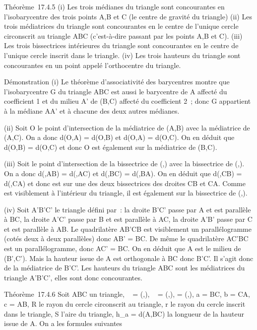 \documentclass[]{article}
\begin{document}
Théorème~17.4.5 (i) Les trois médianes du triangle sont concourantes en
l'isobarycentre des trois points A,B et C (le centre de gravité du
triangle) (ii) Les trois médiatrices du triangle sont concourantes en le
centre de l'unique cercle circonscrit au triangle ABC (c'est-à-dire
passant par les points A,B et C). (iii) Les trois bissectrices
intérieures du triangle sont concourantes en le centre de l'unique
cercle inscrit dans le triangle. (iv) Les trois hauteurs du triangle
sont concourantes en un point appelé l'orthocentre du triangle.

Démonstration (i) Le théorème d'associativité des barycentres montre que
l'isobarycentre G du triangle ABC est aussi le barycentre de A affecté
du coefficient 1 et du milieu A' de (B,C) affecté du coefficient 2~;
donc G appartient à la médiane AA' et à chacune des deux autres
médianes.

(ii) Soit O le point d'intersection de la médiatrice de (A,B) avec la
médiatrice de (A,C). On a donc d(O,A) = d(O,B) et d(O,A) = d(O,C). On en
déduit que d(O,B) = d(O,C) et donc O est également sur la médiatrice de
(B,C).

(iii) Soit \Omega le point d'intersection de la bissectrice de
(\overrightarrowAB,\overrightarrowAC)
avec la bissectrice de
(\overrightarrowBC,\overrightarrowBA).
On a donc d(\Omega,AB) = d(\Omega,AC) et d(\Omega,BC) = d(\Omega,BA). On en déduit que
d(\Omega,CB) = d(\Omega,CA) et donc \Omega est sur une des deux bissectrices des
droites CB et CA. Comme \Omega est visiblement à l'intérieur du triangle, il
est également sur la bissectrice de
(\overrightarrowCA,\overrightarrowCB).

(iv) Soit A'B'C' le triangle défini par~: la droite B'C' passe par A et
est parallèle à BC, la droite A'C' passe par B et est parallèle à AC, la
droite A'B' passe par C et est parallèle à AB. Le quadrilatère AB'CB est
visiblement un parallélogramme (cotés deux à deux parallèles) donc AB' =
BC. De même le quadrilatère AC'BC est un parallélogramme, donc AC' = BC.
On en déduit que A est le milieu de (B',C'). Mais la hauteur issue de A
est orthogonale à BC donc B'C'. Il s'agit donc de la médiatrice de B'C'.
Les hauteurs du triangle ABC sont les médiatrices du triangle A'B'C',
elles sont donc concourantes.

Théorème~17.4.6 Soit ABC un triangle, \alpha~ =\widehat
(\overrightarrowAB,\overrightarrowAC),
\beta~ =\widehat
(\overrightarrowBC,\overrightarrowBA),
\gamma =\widehat
(\overrightarrowCA,\overrightarrowCB),
a = BC, b = CA, c = AB, R le rayon du cercle circonscrit au triangle, r
le rayon du cercle inscrit dans le triangle, S l'aire du triangle,
h_a = d(A,BC) la longueur de la hauteur issue de A. On a les
formules suivantes
\end{document}
